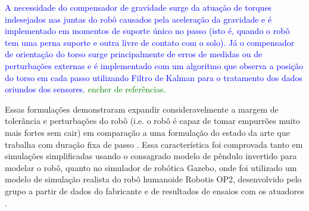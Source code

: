 \textcolor{blue}{A necessidade do compensador de gravidade surge da atuação de torques indesejados nas juntas do robô causados pela aceleração da gravidade e é implementado em momentos de suporte único no passo (isto é, quando o robô tem uma perna suporte e outra livre de contato com o solo). Já o compensador de orientação do torso surge principalmente de erros de medidas ou de perturbações externas e é implementado com um algoritmo que observa a posição do torso em cada passo utilizando Filtro de Kalman para o tratamento dos dados oriundos dos sensores.} \textcolor{green}{encher de referências.}

 Essas formulações demonstraram expandir consideravelmente a margem de tolerância e perturbações do robô (i.e. o robô é capaz de tomar empurrões muito mais fortes sem cair) em comparação a uma formulação do estado da arte que trabalha com duração fixa de passo \cite{max30}. Essa característica foi comprovada tanto em simulações simplificadas usando o consagrado modelo de pêndulo invertido \cite{kajita2001} para modelar o robô, quanto no simulador de robótica Gazebo, onde foi utilizado um modelo de simulação realista do robô humanoide Robotis OP2, desenvolvido pelo grupo a partir de dados do fabricante e de resultados de ensaios com os atuadores \cite{max27}. 
 





  
